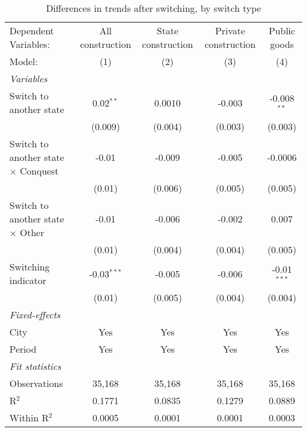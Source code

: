 \begin{table}[htbp]
   \caption{\label{tab:baseline_10y} Differences in trends after switching, by switch type}
   \centering
   \begin{tabular}{lcccc}
      \tabularnewline \midrule \midrule
      Dependent Variables:                       & All construction & State construction & Private construction & Public goods\\  
      Model:                                     & (1)              & (2)                & (3)                  & (4)\\  
      \midrule
      \emph{Variables}\\
      Switch to another state                    & 0.02$^{**}$      & 0.0010             & -0.003               & -0.008$^{**}$\\   
                                                 & (0.009)          & (0.004)            & (0.003)              & (0.003)\\   
      Switch to another state $\times$ Conquest  & -0.01            & -0.009             & -0.005               & -0.0006\\   
                                                 & (0.01)           & (0.006)            & (0.005)              & (0.005)\\   
      Switch to another state $\times$ Other     & -0.01            & -0.006             & -0.002               & 0.007\\   
                                                 & (0.01)           & (0.004)            & (0.004)              & (0.005)\\   
      Switching indicator                        & -0.03$^{***}$    & -0.005             & -0.006               & -0.01$^{***}$\\   
                                                 & (0.01)           & (0.005)            & (0.004)              & (0.004)\\   
      \midrule
      \emph{Fixed-effects}\\
      City                                       & Yes              & Yes                & Yes                  & Yes\\  
      Period                                     & Yes              & Yes                & Yes                  & Yes\\  
      \midrule
      \emph{Fit statistics}\\
      Observations                               & 35,168           & 35,168             & 35,168               & 35,168\\  
      R$^2$                                      & 0.1771           & 0.0835             & 0.1279               & 0.0889\\  
      Within R$^2$                               & 0.0005           & 0.0001             & 0.0001               & 0.0003\\  
      \midrule \midrule
      

\end{tabular}
\end{table}
